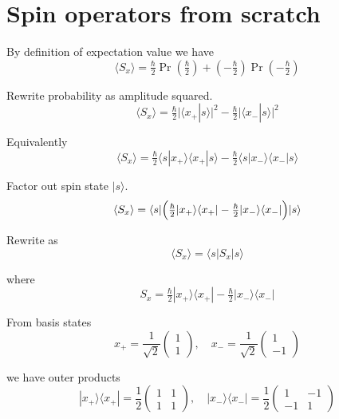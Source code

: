 

\section*{Spin operators from scratch}

By definition of expectation value we have
\begin{equation*}
\langle S_x\rangle=\tfrac{\hbar}{2}\Pr\left(\tfrac{\hbar}{2}\right)
+\left(-\tfrac{\hbar}{2}\right)\Pr\left(-\tfrac{\hbar}{2}\right)
\end{equation*}

Rewrite probability as amplitude squared.
\begin{equation*}
\langle S_x\rangle=\tfrac{\hbar}{2}\bigl|\langle x_+|s\rangle\bigr|^2
-\tfrac{\hbar}{2}\bigl|\langle x_-|s\rangle\bigr|^2
\end{equation*}

Equivalently
\begin{equation*}
\langle S_x\rangle
=\tfrac{\hbar}{2}\langle s|x_+\rangle\langle x_+|s\rangle
-\tfrac{\hbar}{2}\langle s|x_-\rangle\langle x_-|s\rangle
\end{equation*}

Factor out spin state $|s\rangle$.
\begin{equation*}
\langle S_x\rangle=\langle s|\Bigl(
\tfrac{\hbar}{2}|x_+\rangle\langle x_+|-\tfrac{\hbar}{2}|x_-\rangle\langle x_-|
\Bigr)|s\rangle
\end{equation*}

Rewrite as
\begin{equation*}
\langle S_x\rangle=\langle s|S_x|s\rangle
\end{equation*}

where
\begin{equation*}
S_x=\tfrac{\hbar}{2}|x_+\rangle\langle x_+|-\tfrac{\hbar}{2}|x_-\rangle\langle x_-|
\end{equation*}

From basis states
\begin{equation*}
x_+=\frac{1}{\sqrt2}\begin{pmatrix}1\\1\end{pmatrix},\quad
x_-=\frac{1}{\sqrt2}\begin{pmatrix}1\\-1\end{pmatrix}
\end{equation*}

we have outer products
\begin{equation*}
|x_+\rangle\langle x_+|=\frac{1}{2}\begin{pmatrix}1&1\\1&1\end{pmatrix},\quad
|x_-\rangle\langle x_-|=\frac{1}{2}\begin{pmatrix}1&-1\\-1&1\end{pmatrix}
\end{equation*}

